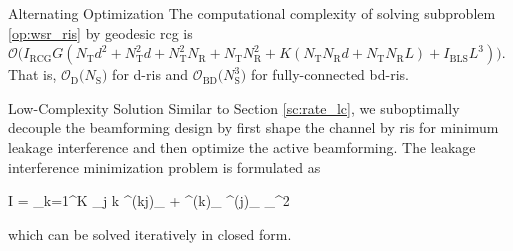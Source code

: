 \documentclass[
	fontsize=11pt,
	paper=a4,
	foldmarks=false
]{scrartcl}
\begin{document}
\begin{reviewer}
{{\begin{subsubsection}{Alternating Optimization}
					The computational complexity of solving subproblem \eqref{op:wsr_ris} by geodesic \gls{rcg} is $\mathcal{O}\bigl(I_\text{RCG} G (N_\mathrm{T} d^2 + N_\mathrm{T}^2 d + N_\mathrm{T}^2 N_\mathrm{R} + N_\mathrm{T} N_\mathrm{R}^2 + K (N_\mathrm{T} N_\mathrm{R} d + N_\mathrm{T} N_\mathrm{R} L) + I_\text{BLS}L^3)\bigr)$.
					That is, $\mathcal{O}_\mathrm{D}\bigl(N_\mathrm{S}\bigr)$ for \gls{d}-\gls{ris} and $\mathcal{O}_\mathrm{BD}\bigl(N_\mathrm{S}^3\bigr)$ for fully-connected \gls{bd}-\gls{ris}.
				\end{subsubsection}

				\begin{subsubsection}{Low-Complexity Solution}
					Similar to Section \ref{sc:rate_lc}, we suboptimally decouple the beamforming design by first shape the channel by \gls{ris} for minimum leakage interference and then optimize the active beamforming.
					The leakage interference minimization problem is formulated as
					\begin{mini*}
						{\scriptstyle{\mathbf{\Theta}}}{I = \sum_{k=1}^K \sum_{j \ne k} \left{}^{(kj)}_ + {}^{(k)}_ \mathbf{\Theta} {}^{(j)}_\mathrm{F} \right\rVert _{}^2}{}{}
					\end{mini*}
					which can be solved iteratively in closed form.


\end{subsubsection}}}
\end{reviewer}
\end{document}
